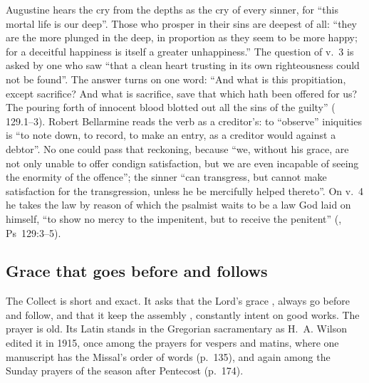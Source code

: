 Augustine hears the cry from the depths as the cry of every sinner, for ``this
mortal life is our deep''. Those who prosper in their sins are deepest of all:
``they are the more plunged in the deep, in proportion as they seem to be more
happy; for a deceitful happiness is itself a greater unhappiness.'' The
question of v.~3 is asked by one who saw ``that a clean heart trusting in its
own righteousness could not be found''. The answer turns on one word: ``And
what is this propitiation, except sacrifice? And what is sacrifice, save that
which hath been offered for us? The pouring forth of innocent blood blotted out
all the sins of the guilty'' ( 129.1--3).
Robert Bellarmine reads the verb as a creditor's: to ``observe'' iniquities is
``to note down, to record, to make an entry, as a creditor would against a
debtor''. No one could pass that reckoning, because ``we, without his grace,
are not only unable to offer condign satisfaction, but we are even incapable of
seeing the enormity of the offence''; the sinner ``can transgress, but cannot
make satisfaction for the transgression, unless he be mercifully helped
thereto''. On v.~4 he takes the law by reason of which the psalmist waits to be
a law God laid on himself, ``to show no mercy to the impenitent, but to receive
the penitent'' (, Ps~129:3--5).

\subsection{Grace that goes before and follows}

The Collect is short and exact. It asks that the Lord's grace , always go before and follow, and that it keep the
assembly , constantly intent on
good works. The prayer is old. Its Latin stands in the Gregorian sacramentary
as H.~A. Wilson edited it in 1915, once among the prayers for vespers and
matins, where one manuscript has the Missal's order of words (p.~135), and
again among the Sunday prayers of the season after Pentecost (p.~174).

